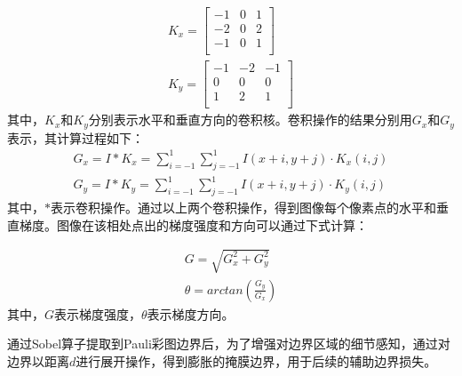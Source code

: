 \begin{gather}
    K_x=\left[ \begin{matrix}
            -1 & 0 & 1 \\
            -2 & 0 & 2 \\
            -1 & 0 & 1 \\
        \end{matrix} \right]
    \\
    K_y=\left[ \begin{matrix}
            -1 & -2 & -1 \\
            0  & 0  & 0  \\
            1  & 2  & 1  \\
        \end{matrix} \right]
\end{gather}
其中，$K_x$和$K_y$分别表示水平和垂直方向的卷积核。卷积操作的结果分别用$G_x$和$G_y$表示，其计算过程如下：
\begin{gather}
    G_x=I \ast K_x=\sum_{i=-1}^1{\sum_{j=-1}^1{I\left( x+i,y+j \right) \cdot K_x\left( i,j \right)}}
    \\
    G_y=I \ast K_y=\sum_{i=-1}^1{\sum_{j=-1}^1{I\left( x+i,y+j \right) \cdot K_y\left( i,j \right)}}
\end{gather}
其中，$\ast$表示卷积操作。通过以上两个卷积操作，得到图像每个像素点的水平和垂直梯度。图像在该相处点出的梯度强度和方向可以通过下式计算：

\begin{gather}
    G=\sqrt{G_x^2+G_y^2}
    \\
    \theta=arctan(\frac{G_y}{G_x})
\end{gather}
其中，$G$表示梯度强度，$\theta$表示梯度方向。

通过Sobel算子提取到Pauli彩图边界后，为了增强对边界区域的细节感知，通过对边界以距离$d$进行展开操作，得到膨胀的掩膜边界，用于后续的辅助边界损失。




